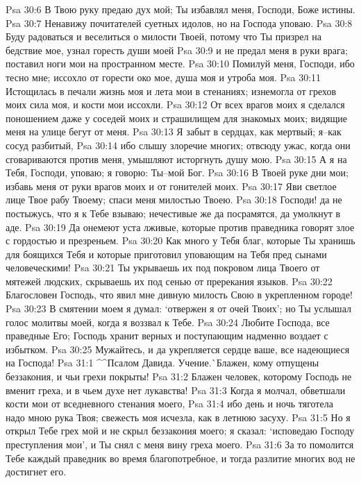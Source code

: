 Psa 30:6  В Твою руку предаю дух мой; Ты избавлял меня, Господи, Боже истины.
Psa 30:7  Ненавижу почитателей суетных идолов, но на Господа уповаю.
Psa 30:8  Буду радоваться и веселиться о милости Твоей, потому что Ты призрел на бедствие мое, узнал горесть души моей
Psa 30:9  и не предал меня в руки врага; поставил ноги мои на пространном месте.
Psa 30:10  Помилуй меня, Господи, ибо тесно мне; иссохло от горести око мое, душа моя и утроба моя.
Psa 30:11  Истощилась в печали жизнь моя и лета мои в стенаниях; изнемогла от грехов моих сила моя, и кости мои иссохли.
Psa 30:12  От всех врагов моих я сделался поношением даже у соседей моих и страшилищем для знакомых моих; видящие меня на улице бегут от меня.
Psa 30:13  Я забыт в сердцах, как мертвый; я--как сосуд разбитый,
Psa 30:14  ибо слышу злоречие многих; отвсюду ужас, когда они сговариваются против меня, умышляют исторгнуть душу мою.
Psa 30:15  А я на Тебя, Господи, уповаю; я говорю: Ты--мой Бог.
Psa 30:16  В Твоей руке дни мои; избавь меня от руки врагов моих и от гонителей моих.
Psa 30:17  Яви светлое лице Твое рабу Твоему; спаси меня милостью Твоею.
Psa 30:18  Господи! да не постыжусь, что я к Тебе взываю; нечестивые же да посрамятся, да умолкнут в аде.
Psa 30:19  Да онемеют уста лживые, которые против праведника говорят злое с гордостью и презреньем.
Psa 30:20  Как много у Тебя благ, которые Ты хранишь для боящихся Тебя и которые приготовил уповающим на Тебя пред сынами человеческими!
Psa 30:21  Ты укрываешь их под покровом лица Твоего от мятежей людских, скрываешь их под сенью от пререкания языков.
Psa 30:22  Благословен Господь, что явил мне дивную милость Свою в укрепленном городе!
Psa 30:23  В смятении моем я думал: `отвержен я от очей Твоих'; но Ты услышал голос молитвы моей, когда я воззвал к Тебе.
Psa 30:24  Любите Господа, все праведные Его; Господь хранит верных и поступающим надменно воздает с избытком.
Psa 30:25  Мужайтесь, и да укрепляется сердце ваше, все надеющиеся на Господа!
Psa 31:1  ^^Псалом Давида. Учение.^^ Блажен, кому отпущены беззакония, и чьи грехи покрыты!
Psa 31:2  Блажен человек, которому Господь не вменит греха, и в чьем духе нет лукавства!
Psa 31:3  Когда я молчал, обветшали кости мои от вседневного стенания моего,
Psa 31:4  ибо день и ночь тяготела надо мною рука Твоя; свежесть моя исчезла, как в летнюю засуху.
Psa 31:5  Но я открыл Тебе грех мой и не скрыл беззакония моего; я сказал: `исповедаю Господу преступления мои', и Ты снял с меня вину греха моего.
Psa 31:6  За то помолится Тебе каждый праведник во время благопотребное, и тогда разлитие многих вод не достигнет его.
